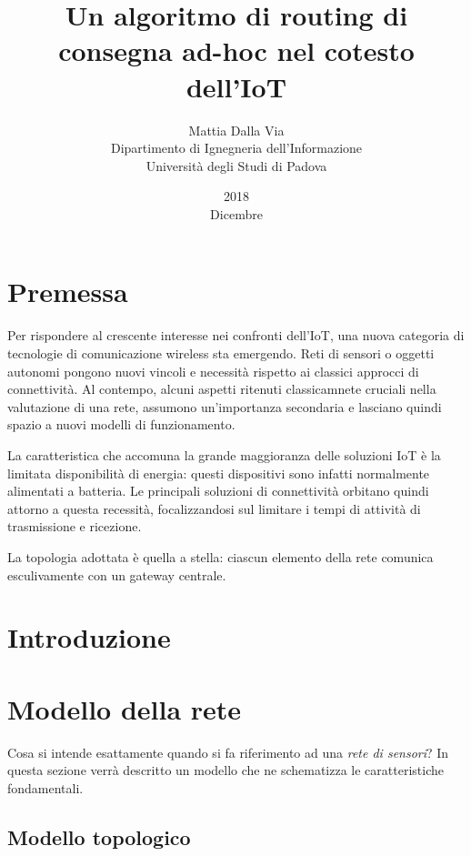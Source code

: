 \documentclass[a4paper,12pt]{article}
\title{Un algoritmo di routing di consegna ad-hoc nel cotesto dell'IoT}
\date{2018\\ Dicembre}
\author{Mattia Dalla Via\\ Dipartimento di Ignegneria dell'Informazione\\ Università degli Studi di Padova}
\theoremstyle{definition}
\begin{document}
\maketitle

\clearpage

\tableofcontents

\section{Premessa}


Per rispondere al crescente interesse nei confronti dell'IoT, una nuova categoria di tecnologie di comunicazione wireless sta emergendo. Reti di sensori o oggetti autonomi pongono nuovi vincoli e necessità rispetto ai classici approcci di connettività. Al contempo, alcuni aspetti ritenuti classicamnete cruciali nella valutazione di una rete, assumono un'importanza secondaria e lasciano quindi spazio a nuovi modelli di funzionamento.


La caratteristica che accomuna la grande maggioranza delle soluzioni IoT è la limitata disponibilità di energia: questi dispositivi sono infatti normalmente alimentati a batteria. Le principali soluzioni di connettività orbitano quindi attorno a questa recessità, focalizzandosi sul limitare i tempi di attività di trasmissione e ricezione.

La topologia adottata è quella a stella: ciascun elemento della rete comunica esculivamente con un gateway centrale.

\section{Introduzione}

\section{Modello della rete}

Cosa si intende esattamente quando si fa riferimento ad una \emph{rete di sensori}? In questa sezione verrà descritto un modello che ne schematizza le caratteristiche fondamentali.

\subsection{Modello topologico}
\end{document}
